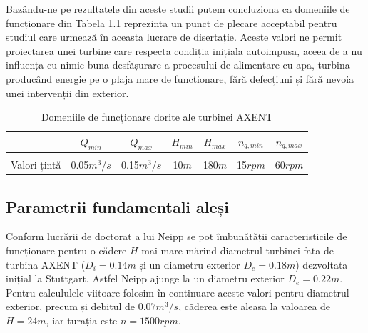 Bazându-ne pe rezultatele din aceste studii putem concluziona ca domeniile de funcționare din Tabela 1.1 reprezinta un punct de plecare acceptabil pentru studiul care urmează în aceasta lucrare de disertație. Aceste valori ne permit proiectarea unei turbine care respecta condiția inițiala autoimpusa, aceea de a nu influența cu nimic buna desfășurare a procesului de alimentare cu apa, turbina producând energie pe o plaja mare de funcționare, fără defecțiuni și fără nevoia unei intervenții din exterior.\\

\begin{table}[ht]
\caption{Domeniile de funcționare dorite ale turbinei AXENT \cite{neipp2017zweistufige}}%
\centering

\begin{tabular}{ c | c | c | c | c | c | c }
           & $Q_{min}$          & $Q_{max}$          & $H_{min}$    & $H_{max}$     & $n_{q,min}$        & $n_{q,max}$ \\ \hline
&&&&&&\\[-0.5em]
Valori țintă  & 0.05$\si{m^3/s}$ & 0.15$\si{m^3/s}$ & 10$\si{m}$ & 180$\si{m}$ & 15$\si{rpm}$ & 60$\si{rpm}$ \\
\end{tabular}

\end{table}


\subsection{Parametrii fundamentali aleși}

Conform lucrării de doctorat a lui Neipp \cite{neipp2017zweistufige} se pot îmbunătății caracteristicile de funcționare pentru o cădere $H$ mai mare mărind diametrul turbinei fata de turbina AXENT ($D_i = 0.14\si{m}$ și un diametru exterior $D_e = 0.18\si{m}$) dezvoltata inițial la Stuttgart. Astfel Neipp ajunge la un diametru exterior $D_e = 0.22\si{m}$. Pentru calcululele viitoare folosim în continuare aceste valori pentru diametrul exterior, precum și debitul de $0.07\si{m^3/s}$, căderea este aleasa la valoarea de $H=24\si{m}$, iar turația este $n=1500\si{rpm}$.

\clearpage